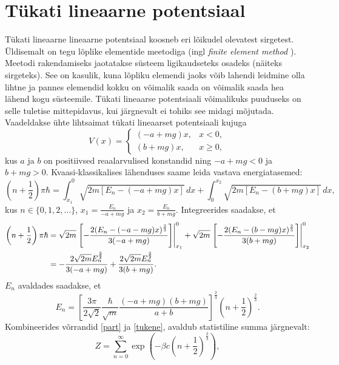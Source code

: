 \documentclass{trkut}%
\begin{document}
\section{Tükati lineaarne potentsiaal}

Tükati lineaarne lineaarne potentsiaal koosneb eri lõikudel olevatest sirgetest.
Üldisemalt on tegu lõplike elementide meetodiga (ingl \textit{finite element method }).
Meetodi rakendamiseks jaotatakse süsteem ligikaudseteks osadeks (näiteks sirgeteks).
See on kasulik, kuna lõpliku elemendi jaoks võib lahendi leidmine olla lihtne ja pannes elemendid kokku on võimalik saada on võimalik saada hea lähend kogu süsteemile.
Tükati lineaarse potentsiaali võimalikuks puuduseks on selle tuletise mittepidavus, kui järgnevalt ei tohiks see midagi mõjutada.
Vaadeldakse ühte lihtsaimat tükati lineaarset potentsiaali kujuga
\begin{equation} \label{linpot}
    V(x)=\begin{cases}
        (-a+mg)x, & x<0,\\
        (b+mg)x, & x\ge0,
    \end{cases}
\end{equation}
kus $a$ ja $b$ on positiivsed reaalarvulised konstandid ning $-a+mg<0$ ja $b+mg>0$.
Kvaasi-klassikalises lähenduses saame leida vastava energiatasemed:
\begin{equation}
    \left( n+\frac{1}{2}\right)\pi \hbar = \int_{x_1}^{0} \sqrt{2m[E_n-(-a+mg)x]}\, dx + \int_{0}^{x_2} \sqrt{2m[E_n-(b+mg)x]} \, dx,
\end{equation}
kus \(n \in \{0, 1, 2, ...\}\), \(x_1=\frac{E_n}{-a+mg}\) ja \(x_2=\frac{E_n}{b+mg}\). Integreerides saadakse, et
\begin{align}
    \left(n+\frac{1}{2}\right)\pi \hbar &= \sqrt{2m}\left.\left[-\frac{2(E_n-(-a-mg)x)^\frac{2}{3}}{3(-a+mg)}\right]\right|^0_{x_1} + \sqrt{2m}\left.\left[-\frac{2(E_n-(b-mg)x)^\frac{2}{3}}{3(b+mg)}\right]\right|^{0}_{x_2} \notag \\
    &= -\frac{2\sqrt{2m}E_n^{\frac{3}{2}}}{3(-a+mg)}+\frac{2\sqrt{2m}E_n^{\frac{3}{2}}}{3(b+mg)}.
\end{align}
$E_n$ avaldades saadakse, et
\begin{equation}
    E_n =\left[\frac{3\pi}{2\sqrt{2}} \frac{\hbar}{\sqrt{m}} \frac{(-a+mg)(b+mg)}{a+b}\right]^{\frac{2}{3}} \left(n+\frac{1}{2}\right)^{\frac{2}{3}} . \label{tukene}
\end{equation}
Kombineerides võrrandid \eqref{part} ja \eqref{tukene}, avaldub statistiline summa järgnevalt:
\begin{equation}
    Z=\sum_{n=0}^{\infty} \exp \left( -\beta c \left(n+\frac{1}{2}\right)^\frac{2}{3} \right),
    \label{linsum}
\end{equation}
\end{document}
